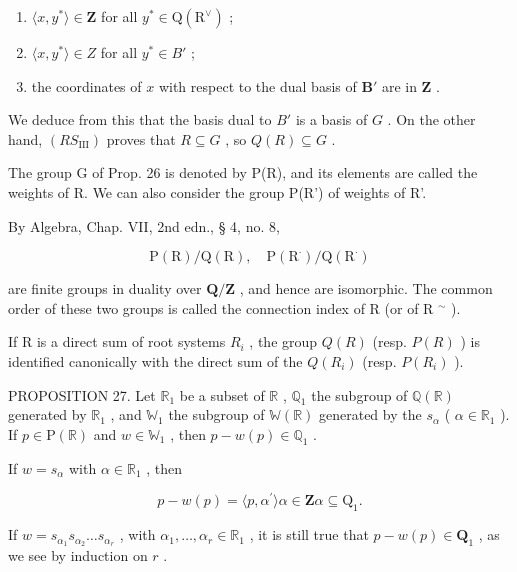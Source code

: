 \begin{enumerate}
\def\labelenumi{(\roman{enumi})}
\item
  \(\langle x, y^{*} \rangle \in \mathbf{Z}\) for all \(y^{*} \in \mathrm{Q}(\mathrm{R}^{\vee})\) ;
\item
  \(\langle x, y^{*} \rangle \in Z\) for all \(y^{*} \in B'\) ;
\item
  the coordinates of \(x\) with respect to the dual basis of \(\mathbf{B}'\) are in \(\mathbf{Z}\) .
\end{enumerate}

We deduce from this that the basis dual to \(B'\) is a basis of \(G\) . On the other hand, \((RS_{\mathrm{III}})\) proves that \(R \subseteq G\) , so \(Q(R) \subseteq G\) .

The group G of Prop. 26 is denoted by P(R), and its elements are called the weights of R. We can also consider the group P(R') of weights of R'.

By Algebra, Chap. VII, 2nd edn., § 4, no. 8,

\[
\mathrm{P} (\mathrm{R}) / \mathrm{Q} (\mathrm{R}), \quad \mathrm{P} (\mathrm{R} ^ {\cdot}) / \mathrm{Q} (\mathrm{R} ^ {\cdot})
\]

are finite groups in duality over \(\mathbf{Q} / \mathbf{Z}\) , and hence are isomorphic. The common order of these two groups is called the connection index of R (or of R \(^{\sim}\) ).

If R is a direct sum of root systems \(R_{i}\) , the group \(Q(R)\) (resp. \(P(R)\) ) is identified canonically with the direct sum of the \(Q(R_{i})\) (resp. \(P(R_{i})\) ).

PROPOSITION 27. Let \(\mathbb{R}_1\) be a subset of \(\mathbb{R}\) , \(\mathbb{Q}_1\) the subgroup of \(\mathbb{Q}(\mathbb{R})\) generated by \(\mathbb{R}_1\) , and \(\mathbb{W}_1\) the subgroup of \(\mathbb{W}(\mathbb{R})\) generated by the \(s_\alpha\) ( \(\alpha \in \mathbb{R}_1\) ). If \(p \in \mathrm{P}(\mathbb{R})\) and \(w \in \mathbb{W}_1\) , then \(p - w(p) \in \mathbb{Q}_1\) .

If \(w = s_{\alpha}\) with \(\alpha \in \mathbb{R}_1\) , then

\[
p - w (p) = \langle p, \alpha^ {\prime} \rangle \alpha \in \mathbf {Z} \alpha \subseteq \mathrm{Q} _ {1}.
\]

If \(w = s_{\alpha_1}s_{\alpha_2}\ldots s_{\alpha_r}\) , with \(\alpha_{1},\ldots ,\alpha_{r}\in \mathbb{R}_{1}\) , it is still true that \(p - w(p)\in \mathbf{Q}_1\) , as we see by induction on \(r\) .

